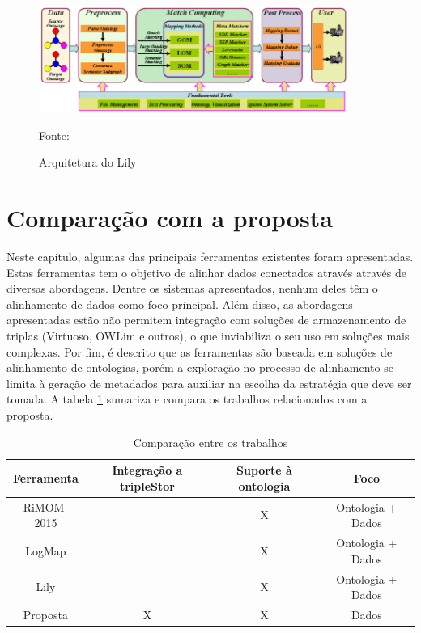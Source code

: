 \begin{figure}[!ht]
	\centering
	\includegraphics[width=0.9\textwidth]{./imagens/lily.png}
    \caption{Arquitetura do Lily}
	\footnotesize{Fonte: \cite{euzenat2013d}}
	\label{fig:lily}
\end{figure}

\section{Comparação com a proposta}

Neste capítulo, algumas das principais ferramentas existentes foram apresentadas. Estas ferramentas tem o objetivo de alinhar dados conectados através através de diversas abordagens.
Dentre os sistemas apresentados, nenhum deles têm o alinhamento de dados como foco principal. Além disso, as abordagens apresentadas estão não permitem integração com soluções de armazenamento de triplas (Virtuoso, OWLim e outros), o que inviabiliza o seu uso em soluções mais complexas. Por fim, é descrito que as ferramentas são baseada em soluções de alinhamento de ontologias, porém a exploração no processo de alinhamento se limita à geração de metadados para auxiliar na escolha da estratégia que deve ser tomada. A tabela \ref{tab:comparacao} sumariza e compara os trabalhos relacionados com a proposta.

\begin{table}[h]
\centering
\caption{Comparação entre os trabalhos}
\label{tab:comparacao}
\begin{tabular}{@{}cccc@{}}
\toprule
Ferramenta & Integração a tripleStor & Suporte à ontologia & Foco               \\ \midrule
RiMOM-2015 &                         & X                   & Ontologia + Dados \\
LogMap     &                         & X                   & Ontologia + Dados \\
Lily       &                         & X                   & Ontologia + Dados \\
Proposta   & X                       & X                   & Dados             \\ \midrule
\end{tabular}
\end{table}
